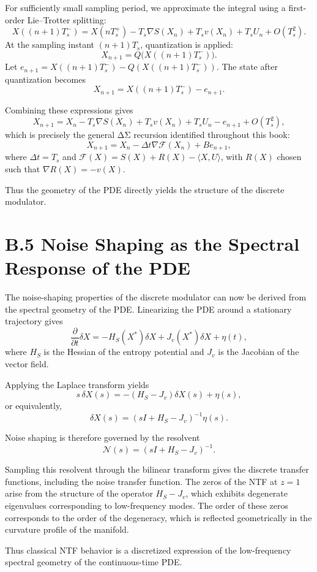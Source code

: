For sufficiently small sampling period, we approximate the integral using a first-order Lie–Trotter splitting:
\[
X((n+1)T_s^{-}) = X(nT_s^{+}) - T_s \nabla S(X_n) + T_s v(X_n) + T_s U_n + O(T_s^2).
\]
At the sampling instant \((n+1)T_s\), quantization is applied:
\[
X_{n+1} = Q\bigl(X((n+1)T_s^{-})\bigr).
\]
Let \(e_{n+1} = X((n+1)T_s^{-}) - Q(X((n+1)T_s^{-}))\). The state after quantization becomes
\[
X_{n+1} = X((n+1)T_s^{-}) - e_{n+1}.
\]

Combining these expressions gives
\[
X_{n+1} = X_n - T_s \nabla S(X_n) + T_s v(X_n) + T_s U_n - e_{n+1} + O(T_s^2),
\]
which is precisely the general ΔΣ recursion identified throughout this book:
\[
X_{n+1} = X_n - \Delta t \nabla\mathcal{F}(X_n) + B e_{n+1},
\]
where \(\Delta t = T_s\) and \(\mathcal{F}(X) = S(X) + R(X) - \langle X,U\rangle\), with \(R(X)\) chosen such that \(\nabla R(X) = -v(X)\).

Thus the geometry of the PDE directly yields the structure of the discrete modulator.

\section{B.5 Noise Shaping as the Spectral Response of the PDE}

The noise-shaping properties of the discrete modulator can now be derived from the spectral geometry of the PDE. Linearizing the PDE around a stationary trajectory gives
\[
\frac{\partial}{\partial t} \delta X = -H_S(X^\ast)\delta X + J_v(X^\ast)\delta X + \eta(t),
\]
where \(H_S\) is the Hessian of the entropy potential and \(J_v\) is the Jacobian of the vector field.

Applying the Laplace transform yields
\[
s \,\delta X(s) = -(H_S - J_v)\delta X(s) + \eta(s),
\]
or equivalently,
\[
\delta X(s) = (sI + H_S - J_v)^{-1}\eta(s).
\]

Noise shaping is therefore governed by the resolvent
\[
\mathcal{N}(s) = (sI + H_S - J_v)^{-1}.
\]

Sampling this resolvent through the bilinear transform gives the discrete transfer functions, including the noise transfer function. The zeros of the NTF at \(z=1\) arise from the structure of the operator \(H_S - J_v\), which exhibits degenerate eigenvalues corresponding to low-frequency modes. The order of these zeros corresponds to the order of the degeneracy, which is reflected geometrically in the curvature profile of the manifold.

Thus classical NTF behavior is a discretized expression of the low-frequency spectral geometry of the continuous-time PDE.

